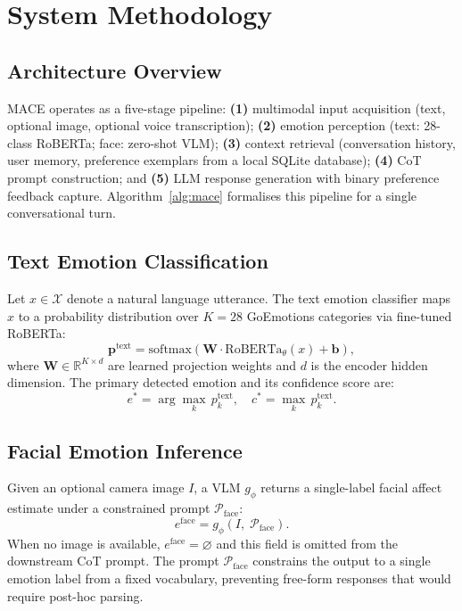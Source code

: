 \documentclass[conference]{IEEEtran}
\begin{document}
\section{System Methodology}
\label{sec:methodology}

\subsection{Architecture Overview}

MACE operates as a five-stage pipeline:
\textbf{(1)} multimodal input acquisition (text, optional image,
optional voice transcription);
\textbf{(2)} emotion perception (text: 28-class RoBERTa;
face: zero-shot VLM);
\textbf{(3)} context retrieval (conversation history, user memory,
preference exemplars from a local SQLite database);
\textbf{(4)} CoT prompt construction; and
\textbf{(5)} LLM response generation with binary preference
feedback capture.
Algorithm~\ref{alg:mace} formalises this pipeline for a single
conversational turn.

\subsection{Text Emotion Classification}

Let $x \in \mathcal{X}$ denote a natural language utterance.
The text emotion classifier maps $x$ to a probability
distribution over $K{=}28$ GoEmotions categories via fine-tuned
RoBERTa:
\begin{equation}
    \mathbf{p}^{\text{text}} = \text{softmax}\!\left(
    \mathbf{W} \cdot \text{RoBERTa}_\theta(x) + \mathbf{b}
    \right),
    \label{eq:text_emotion}
\end{equation}
where $\mathbf{W} \in \mathbb{R}^{K \times d}$ are learned
projection weights and $d$ is the encoder hidden dimension.
The primary detected emotion and its confidence score are:
\begin{equation}
    e^* = \arg\max_{k} \, p^{\text{text}}_k, \quad
    c^* = \max_{k} \, p^{\text{text}}_k.
    \label{eq:primary_emotion}
\end{equation}

\subsection{Facial Emotion Inference}

Given an optional camera image $I$, a VLM $g_\phi$ returns a
single-label facial affect estimate under a constrained
prompt $\mathcal{P}_{\text{face}}$:
\begin{equation}
    e^{\text{face}} = g_\phi\!\left(I,\; \mathcal{P}_{\text{face}}\right).
    \label{eq:face_emotion}
\end{equation}
When no image is available, $e^{\text{face}}{=}\varnothing$ and
this field is omitted from the downstream CoT prompt.
The prompt $\mathcal{P}_{\text{face}}$ constrains the output to a
single emotion label from a fixed vocabulary, preventing
free-form responses that would require post-hoc parsing.
\end{document}
